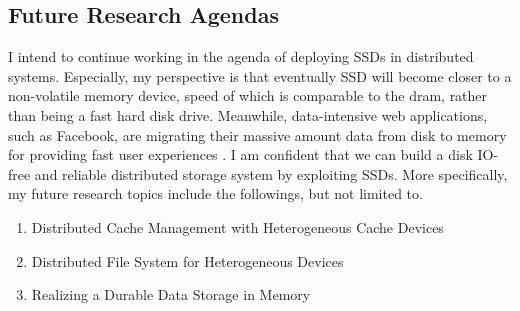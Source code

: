 \documentclass[letterpaper, 10pt]{article}
\begin{document}
\subsection*{Future Research Agendas}

I intend to continue working in the agenda of deploying SSDs in distributed
systems. Especially, my perspective is that eventually SSD will become
closer to
a non-volatile memory device, speed of which is comparable to the dram,
rather than being a fast hard disk drive.
Meanwhile, data-intensive web applications, such as Facebook, are migrating
their massive amount data from disk to memory for providing fast user
experiences \cite{fb}.
I am confident that we can build a disk IO-free and reliable
distributed storage
system by exploiting SSDs. More specifically, my future research topics include
the followings, but not limited to.

\begin{enumerate}
\item Distributed Cache Management with Heterogeneous Cache Devices
\item Distributed File System for Heterogeneous Devices
\item Realizing a Durable Data Storage in Memory
\end{enumerate}

\vspace{0.5cm}

\end{document}
